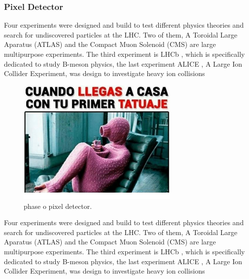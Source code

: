 \subsubsection{Pixel Detector}
Four experiments were designed and build to test different physics theories and search for undiscovered particles at the LHC. Two of them, A Toroidal Large Aparatus (ATLAS)\cite{atlas} and the Compact Muon Solenoid (CMS)\cite{cms_doc} are large multipurpose experiments. The third experiment is LHCb \cite{lhcb}, which is specifically dedicated to study B-meson physics, the last experiment ALICE \cite{alice}, A Large Ion Collider Experiment, was design to investigate heavy ion collisions
\begin{figure}[!h]
  \centering
  \includegraphics[width=0.7\textwidth]{../images/ch2/5}
  \caption[phase o pixel detector]{phase o pixel detector.}\label{fig:cms_layout}
\end{figure}
Four experiments were designed and build to test different physics theories and search for undiscovered particles at the LHC. Two of them, A Toroidal Large Aparatus (ATLAS)\cite{atlas} and the Compact Muon Solenoid (CMS)\cite{cms_doc} are large multipurpose experiments. The third experiment is LHCb \cite{lhcb}, which is specifically dedicated to study B-meson physics, the last experiment ALICE \cite{alice}, A Large Ion Collider Experiment, was design to investigate heavy ion collisions
